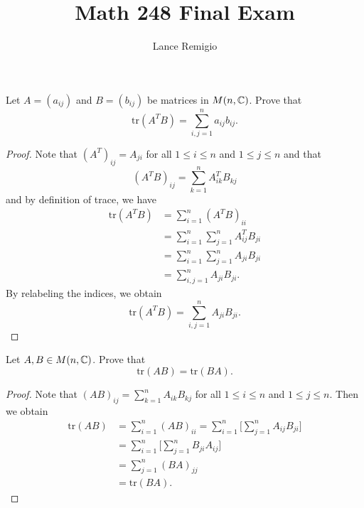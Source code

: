 \documentclass{article}
\title{Math 248 Final Exam}
\author{Lance Remigio}
\begin{document}
\maketitle
\tableofcontents
\newpage

\begin{problem}
    Let \( A = ({a}_{ij}) \) and \( B = ({b}_{ij}) \) be matrices in \( M(n,\mathbb{C}) \). Prove that 
    \[  \text{tr}(A^{T}B) = \sum_{ i,j = 1  }^{ n  } {a}_{ij} {b}_{ij}. \]
\end{problem}
\begin{proof}
    Note that \( (A^{T})_{ij} = {A}_{ji} \) for all \( 1 \leq i \leq n  \) and \( 1 \leq j \leq n  \) and that 
    \[  (A^{T} B)_{ij} = \sum_{ k=1  }^{ n } {A}_{ik}^{T} {B}_{kj} \]
    and by definition of trace, we have 
    \begin{align*}
        \text{tr}(A^{T}B) &= \sum_{ i=1  }^{ n } (A^{T}B)_{ii} \\
                          &= \sum_{ i=1  }^{ n } \sum_{ j=1  }^{ n } {A}_{ij}^{T} {B}_{ji} \\
                          &= \sum_{ i=1  }^{ n } \sum_{ j=1  }^{ n } {A}_{ji} {B}_{ji} \\
                          &= \sum_{ i,j = 1  }^{ n  } {A}_{ji} {B}_{ji}.
    \end{align*}
    By relabeling the indices, we obtain
    \[ \text{tr}(A^{T}B) = \sum_{ i,j = 1  }^{ n  } {A}_{ji} {B}_{ji}. \]
\end{proof}

\begin{problem}
    Let \( A,B \in M(n,\mathbb{C}) \). Prove that 
    \[  \text{tr}(AB) = \text{tr}(BA). \]
\end{problem}
\begin{proof}
    Note that \( (AB)_{ij} = \sum_{ k=1  }^{ n } {A}_{ik} {B}_{kj} \) for all \( 1 \leq i \leq n  \) and \( 1 \leq j \leq n  \). Then we obtain 
    \begin{align*}
        \text{tr}(AB) &= \sum_{ i=1  }^{ n } (AB)_{ii} = \sum_{ i=1  }^{ n } \Big[ \sum_{ j=1  }^{ n } {A}_{ij} {B}_{ji} \Big] \\
                      &= \sum_{ i=1  }^{ n } \Big[\sum_{ j=1  }^{ n } {B}_{ji} {A}_{ij} \Big] \\
                      &= \sum_{ j=1  }^{ n } (BA)_{j j } \\
                      &= \text{tr}(BA).
    \end{align*}
\end{proof}
\end{document}
